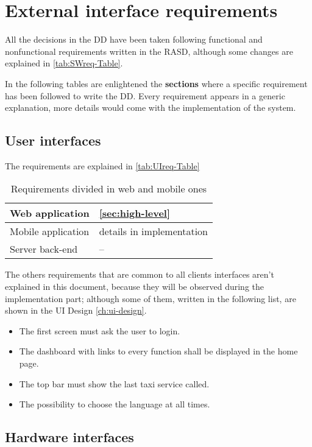 \section{External interface requirements}
All the decisions in the DD have been taken following functional and nonfunctional requirements written in the RASD, although some changes are explained in \autoref{tab:SWreq-Table}.

In the following tables are enlightened the {\bf sections} where a specific requirement has been followed to write the DD. Every requirement appears in a generic explanation, more details would come with the implementation of the system.

\subsection{User interfaces}
The requirements are explained in \autoref{tab:UIreq-Table}
\begin{table}[h]
\begin{center}
\begin{tabular}{|l|l|}
\hline
Web application  & \ref{sec:high-level}\\
\hline
Mobile application  & details in implementation\\
\hline
Server back-end  & --\\
\hline
\end{tabular}
\caption{Requirements divided in web and mobile ones}
\label{tab:UIreq-Table}
\end{center}
\end{table}

The others requirements that are common to all clients interfaces aren't explained in this document, because they will be observed during the implementation part; although some of them, written in the following list, are shown in the UI Design \autoref{ch:ui-design}.
\begin{itemize}
\item The first screen must ask the user to login.
\item The dashboard with links to every function shall be displayed in the home page.
\item The top bar must show the last taxi service called.
\item The possibility to choose the language at all times. %
\end{itemize}


\subsection{Hardware interfaces}

